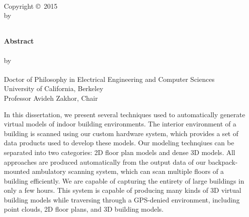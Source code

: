\documentclass[12pt,onecolumn,oneside]{book}
\begin{document}
\newpage
{\centering
	{\textbf{\mytitle}}\\
	\hfill \break
	\hfill \break
	\hfill \break
	\hfill \break
	\hfill \break
	Copyright \copyright \, 2015\\
	by\\
	\myauthor\\
}


\newpage
{}
\setcounter{page}{1}

{\centering
	{\textbf{Abstract}}\\
	\hfill \break
	\mytitle\\
	\hfill \break
	by\\
	\hfill \break
	\myauthor\\
	\hfill \break
	Doctor of Philosophy in Electrical Engineering and Computer Sciences\\
	\hfill \break
	University of California, Berkeley\\
	\hfill \break
	Professor Avideh Zakhor, Chair\\
	\hfill \break
}

In this dissertation, we present several techniques used to automatically generate virtual models of indoor building environments.  The interior environment of a building is scanned using our custom hardware system, which provides a set of data products used to develop these models.  Our modeling technqiues can be separated into two categories:  2D floor plan models and dense 3D models.  All approaches are produced automatically from the output data of our backpack-mounted ambulatory scanning system, which can scan multiple floors of a building efficiently.  We are capable of capturing the entirety of large buildings in only a few hours.  This system is capable of producing many kinds of 3D virtual building models while traversing through a GPS-denied environment, including point clouds, 2D floor plans, and 3D building models.
\end{document}

